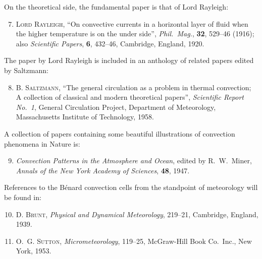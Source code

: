 \noindent On the theoretical side, the fundamental paper is that of Lord Rayleigh:

\begin{enumerate}
\setcounter{enumi}{6}

\item \textsc{Lord Rayleigh}, ``On convective currents in a horizontal layer of fluid
  when the higher temperature is on the under side'', \textit{Phil.\ Mag.},
  \textbf{32}, 529--46 (1916); also \textit{Scientific Papers}, \textbf{6}, 432--46,
  Cambridge, England, 1920.

\end{enumerate}

\noindent The paper by Lord Rayleigh is included in an anthology of related papers edited
by Saltzmann:

\begin{enumerate}
\setcounter{enumi}{7}

\item B. \textsc{Saltzmann}, ``The general circulation as a problem in thermal convection;
  A collection of classical and modern theoretical papers'', \textit{Scientific Report
  No.~1}, General Circulation Project, Department of Meteorology, Massachusetts
  Institute of Technology, 1958.

\end{enumerate}

\noindent A collection of papers containing some beautiful illustrations of convection
phenomena in Nature is:

\begin{enumerate}
\setcounter{enumi}{8}

\item \textit{Convection Patterns in the Atmosphere and Ocean}, edited by
  R.~W.~Miner, \textit{Annals of the New York Academy of Sciences},
  \textbf{48}, 1947.

\end{enumerate}

\noindent References to the B\'enard convection cells from the standpoint of meteorology
will be found in:

\begin{enumerate}
\setcounter{enumi}{9}

\item D. \textsc{Brunt}, \textit{Physical and Dynamical Meteorology}, 219--21,
  Cambridge, England, 1939.

\item O.~G. \textsc{Sutton}, \textit{Micrometeorology}, 119--25, McGraw-Hill Book Co.\
  Inc., New York, 1953.

\end{enumerate}


